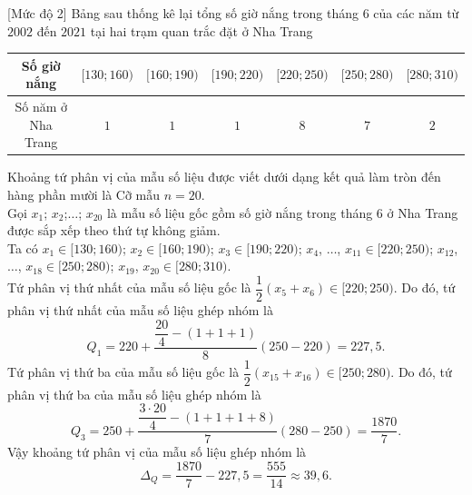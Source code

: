\begin{bt}%
[Mức độ 2]%
	Bảng sau thống kê lại tổng số giờ nắng trong tháng $6$ của các năm từ $2002$ đến $2021$ tại hai trạm quan trắc đặt ở Nha Trang
	\begin{center}
		\begin{tabular}{|c|c|c|c|c|c|c|}
			\hline
			Số giờ nắng &$[130;160)$  & $[160;190)$ & $[190;220)$ & $[220;250)$ & $[250;280)$ & $[280;310)$\\
			\hline
			Số năm ở Nha Trang	& $1$ & $1$ & $1$ & $8$ & $7$ & $2$\\
			\hline
		\end{tabular}
	\end{center}
	Khoảng tứ phân vị của mẫu số liệu được viết dưới dạng kết quả làm tròn đến hàng phần mười là
	\loigiai 
	{	
		Cỡ mẫu $n=20$.\\
		Gọi $x_1$; $x_2$;$\ldots$; $x_{20}$ là mẫu số liệu gốc gồm số giờ nắng trong tháng $6$ ở Nha Trang được sắp xếp theo thứ tự không giảm.\\
		Ta có $x_1\in [130;160)$; $x_2\in [160;190)$; $x_3\in [190;220)$; $x_4$, $\dots$, $x_{11}\in [220;250)$; $x_{12}$, $\dots$, $x_{18}\in [250;280)$; $x_{19}$, $x_{20}\in [280;310)$.\\
		Tứ phân vị thứ nhất của mẫu số liệu gốc là $\dfrac{1}{2}(x_5+x_6)\in [220;250)$. Do đó, tứ phân vị thứ nhất của mẫu số liệu ghép nhóm là 
		$$Q_1=220+\dfrac{\dfrac{20}{4}-(1+1+1)}{8}(250-220)=227{,}5.$$
		Tứ phân vị thứ ba của mẫu số liệu gốc là $\dfrac{1}{2}(x_{15}+x_{16})\in [250;280)$. Do đó, tứ phân vị thứ ba của mẫu số liệu ghép nhóm là 
		$$Q_3=250+\dfrac{\dfrac{3\cdot 20}{4}-(1+1+1+8)}{7}(280-250)=\dfrac{1870}{7}.$$
		Vậy khoảng tứ phân vị của mẫu số liệu ghép nhóm là 
		$$\Delta_Q=\dfrac{1870}{7}-227{,}5=\dfrac{555}{14}\approx 39{,}6.$$
	}
\end{bt}

